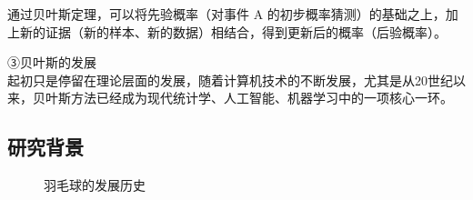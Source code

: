\documentclass[12pt]{article}
\begin{document}
通过贝叶斯定理，可以将先验概率（对事件 A 的初步概率猜测）的基础之上，加上新的证据（新的样本、新的数据）相结合，得到更新后的概率（后验概率）。

③贝叶斯的发展 \\
起初只是停留在理论层面的发展，随着计算机技术的不断发展，尤其是从20世纪以来，贝叶斯方法已经成为现代统计学、人工智能、机器学习中的一项核心一环。


\subsection{研究背景}

\begin{figure}[h]
	\centering
	\caption{羽毛球的发展历史}
	\label{fig:histoy}
	\end{figure}
\end{document}
